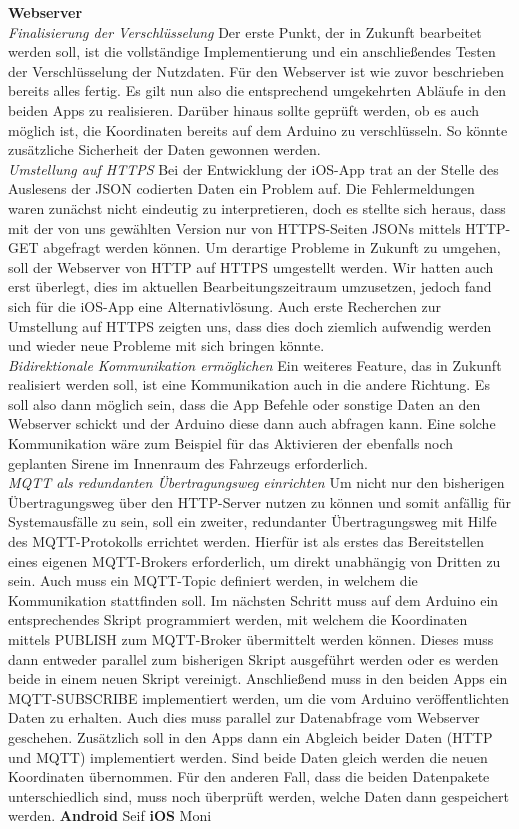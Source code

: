 \textbf{Webserver} 
\\
\textit{Finalisierung der Verschlüsselung}
Der erste Punkt, der in Zukunft bearbeitet werden soll, ist die vollständige Implementierung und ein anschließendes Testen der Verschlüsselung der Nutzdaten. Für den Webserver ist wie zuvor beschrieben bereits alles fertig. Es gilt nun also die entsprechend umgekehrten Abläufe in den beiden Apps zu realisieren.
Darüber hinaus sollte geprüft werden, ob es auch möglich ist, die Koordinaten bereits auf dem Arduino zu verschlüsseln. So könnte zusätzliche Sicherheit der Daten gewonnen werden.
\\
\textit{Umstellung auf HTTPS}
Bei der Entwicklung der iOS-App trat an der Stelle des Auslesens der JSON codierten Daten ein Problem auf. Die Fehlermeldungen waren zunächst nicht eindeutig zu interpretieren, doch es stellte sich heraus, dass mit der von uns gewählten Version nur von HTTPS-Seiten JSONs mittels HTTP-GET abgefragt werden können.
Um derartige Probleme in Zukunft zu umgehen, soll der Webserver von HTTP auf HTTPS umgestellt werden. Wir hatten auch erst überlegt, dies im aktuellen Bearbeitungszeitraum umzusetzen, jedoch fand sich für die iOS-App eine Alternativlösung. Auch erste Recherchen zur Umstellung auf HTTPS zeigten uns, dass dies doch ziemlich aufwendig werden und wieder neue Probleme mit sich bringen könnte.
\\
\textit{Bidirektionale Kommunikation ermöglichen}
Ein weiteres Feature, das in Zukunft realisiert werden soll, ist eine Kommunikation auch in die andere Richtung. Es soll also dann möglich sein, dass die App Befehle oder sonstige Daten an den Webserver schickt und der Arduino diese dann auch abfragen kann. Eine solche Kommunikation wäre zum Beispiel für das Aktivieren der ebenfalls noch geplanten Sirene im Innenraum des Fahrzeugs erforderlich.
\\
\textit{MQTT als redundanten Übertragungsweg einrichten}
Um nicht nur den bisherigen Übertragungsweg über den HTTP-Server nutzen zu können und somit anfällig für Systemausfälle zu sein, soll ein zweiter, redundanter Übertragungsweg mit Hilfe des MQTT-Protokolls errichtet werden. Hierfür ist als erstes das Bereitstellen eines eigenen MQTT-Brokers erforderlich, um direkt unabhängig von Dritten zu sein. Auch muss ein MQTT-Topic definiert werden, in welchem die Kommunikation stattfinden soll. Im nächsten Schritt muss auf dem Arduino ein entsprechendes Skript programmiert werden, mit welchem die Koordinaten mittels PUBLISH zum MQTT-Broker übermittelt werden können. Dieses muss dann entweder parallel zum bisherigen Skript ausgeführt werden oder es werden beide in einem neuen Skript vereinigt. Anschließend muss in den beiden Apps ein MQTT-SUBSCRIBE implementiert werden, um die vom Arduino veröffentlichten Daten zu erhalten. Auch dies muss parallel zur Datenabfrage vom Webserver geschehen. Zusätzlich soll in den Apps dann ein Abgleich beider Daten (HTTP und MQTT) implementiert werden. Sind beide Daten gleich werden die neuen Koordinaten übernommen. Für den anderen Fall, dass die beiden Datenpakete unterschiedlich sind, muss noch überprüft werden, welche Daten dann gespeichert werden. 
\textbf{Android} Seif
\textbf{iOS} Moni